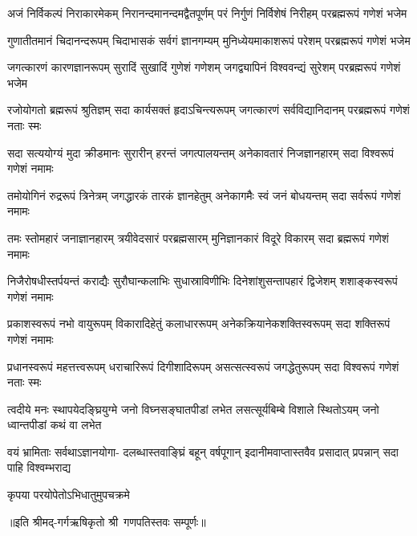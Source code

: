 


\fourlineindentedshloka
{अजं निर्विकल्पं निराकारमेकम्}
{निरानन्दमानन्दमद्वैतपूर्णम्}
{परं निर्गुणं निर्विशेषं निरीहम्}
{परब्रह्मरूपं गणेशं भजेम}%

\fourlineindentedshloka
{गुणातीतमानं चिदानन्दरूपम्}
{चिदाभासकं सर्वगं ज्ञानगम्यम्}
{मुनिध्येयमाकाशरूपं परेशम्}
{परब्रह्मरूपं गणेशं भजेम}%

\fourlineindentedshloka
{जगत्कारणं कारणज्ञानरूपम्}
{सुरादिं सुखादिं गुणेशं गणेशम्}
{जगद्व्यापिनं विश्ववन्द्यं सुरेशम्}
{परब्रह्मरूपं गणेशं भजेम}%

\fourlineindentedshloka
{रजोयोगतो ब्रह्मरूपं श्रुतिज्ञम्}
{सदा कार्यसक्तं हृदाऽचिन्त्यरूपम्}
{जगत्कारणं सर्वविद्यानिदानम्}
{परब्रह्मरूपं गणेशं नताः स्मः}%

\fourlineindentedshloka
{सदा सत्ययोग्यं मुदा क्रीडमानः}
{सुरारीन् हरन्तं जगत्पालयन्तम्}
{अनेकावतारं निजज्ञानहारम्}
{सदा विश्वरूपं गणेशं नमामः}%


\fourlineindentedshloka
{तमोयोगिनं रुद्ररूपं त्रिनेत्रम्}
{जगद्धारकं तारकं ज्ञानहेतुम्}
{अनेकागमैः स्वं जनं बोधयन्तम्}
{सदा सर्वरूपं गणेशं नमामः}%

\fourlineindentedshloka
{तमः स्तोमहारं जनाज्ञानहारम्}
{त्रयीवेदसारं परब्रह्मसारम्}
{मुनिज्ञानकारं विदूरे विकारम्}
{सदा ब्रह्मरूपं गणेशं नमामः}%

\fourlineindentedshloka
{निजैरोषधीस्तर्पयन्तं कराद्यैः}
{सुरौघान्कलाभिः सुधास्राविणीभिः}
{दिनेशांशुसन्तापहारं द्विजेशम्}
{शशाङ्कस्वरूपं गणेशं नमामः}%

\fourlineindentedshloka
{प्रकाशस्वरूपं नभो वायुरूपम्}
{विकारादिहेतुं कलाधाररूपम्}
{अनेकक्रियानेकशक्तिस्वरूपम्}
{सदा शक्तिरूपं गणेशं नमामः}%

\fourlineindentedshloka
{प्रधानस्वरूपं महत्तत्त्वरूपम्}
{धराचारिरूपं दिगीशादिरूपम्}
{असत्सत्स्वरूपं जगद्धेतुरूपम्}
{सदा विश्वरूपं गणेशं नताः स्मः}%

\fourlineindentedshloka
{त्वदीये मनः स्थापयेदङ्घ्रियुग्मे}
{जनो विघ्नसङ्घातपीडां लभेत}
{लसत्सूर्यबिम्बे विशाले स्थितोऽयम्}
{जनो ध्वान्तपीडां कथं वा लभेत}%

\fourlineindentedshloka
{वयं भ्रामिताः सर्वथाऽज्ञानयोगा-}
{दलब्धास्तवाङ्घ्रिं बहून् वर्षपूगान्}
{इदानीमवाप्तास्तवैव प्रसादात्}
{प्रपन्नान् सदा पाहि विश्वम्भराद्य}%

{कृपया परयोपेतोऽभिधातुमुपचक्रमे}%

॥इति श्रीमद्-गर्गऋषिकृतो श्री~गणपतिस्तवः सम्पूर्णः॥
